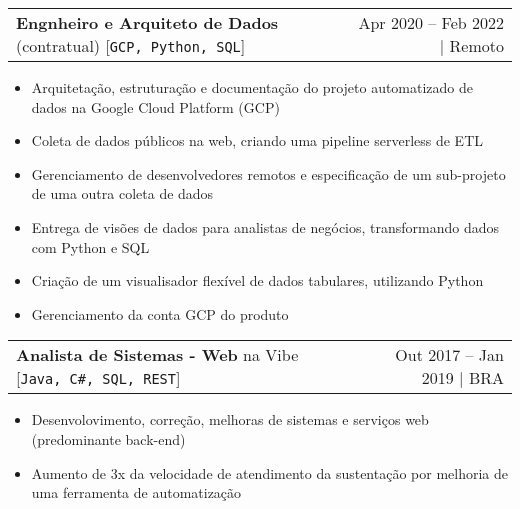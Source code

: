 \documentclass[a4paper,11pt]{article}
\makeatletter
\newcommand{\udensdot}[1]{%
    \tikz[baseline=(todotted.base)]{
        \node[inner sep=0.5pt,outer sep=0.5pt] (todotted) {#1};
        \draw[densely dotted] (todotted.south west) -- (todotted.south east);
    }%
}%
\newcommand{\myHref}[2]{\udensdot{\hspace{-1.2pt}\href{#1}{#2}\hspace{-4pt}}\hspace{-1.2pt}}
\newcommand{\myHrefIcn}[2]{#2 \href{#1}{\scriptsize{\faExternalLink{}}}}
\newcommand{\resumeItemCustom}[1]{
  \item\small{#1 \vspace{-2pt}}
}
\newcommand{\resumeJobSubheadingD}[7]{
  \vspace{0pt}\item
    \begin{tabular*}{0.97\textwidth}{l@{\extracolsep{\fill}}r}
      \textbf{#4} na \myHrefIcn{#1}{#2} \hspace{3pt} [\small \texttt{#6}] & {\small #5}
    \end{tabular*}\vspace{-6pt}
}
\newcommand{\resumeJobSubheadingDx}[5]{
  \vspace{0pt}\item
    \begin{tabular*}{0.97\textwidth}{l@{\extracolsep{\fill}}r}
      \textbf{#2} #1 \hspace{3pt} [\small \texttt{#4}] & {\small #3}
    \end{tabular*}\vspace{-6pt}
}
\newcommand{\resumeItemListStart}{\begin{itemize}}
\newcommand{\resumeItemListEnd}{\end{itemize}\vspace{-5pt}}
\newcommand{\csharp}{C\#}
\makeatother
\begin{document}
    \resumeJobSubheadingDx
      {(contratual)}%
      {Engnheiro e Arquiteto de Dados}{Apr 2020 -- Feb 2022 $\vert$ Remoto}
      {GCP, Python, SQL}%
      {Data platform creation, automated data integration}
      \resumeItemListStart
        \resumeItemCustom{Arquitetação, estruturação e documentação do projeto automatizado de dados na Google Cloud Platform (GCP)}
        \resumeItemCustom{Coleta de dados públicos na web, criando uma pipeline serverless de ETL}
        \resumeItemCustom{Gerenciamento de desenvolvedores remotos e especificação de um sub-projeto de uma outra coleta de dados}
        \resumeItemCustom{Entrega de visões de dados para analistas de negócios, transformando dados com Python e SQL}
        \resumeItemCustom{Criação de um visualisador flexível de dados tabulares, utilizando Python}
        \resumeItemCustom{Gerenciamento da conta GCP do produto}
      \resumeItemListEnd
    
    \resumeJobSubheadingD
      {http://www.vibetecnologia.com/}{Vibe}{Tecnologia para negócios}%
      {Analista de Sistemas - Web}{Out 2017 -- Jan 2019 $\vert$ BRA}
      {Java, \csharp, SQL, REST}%
      {Aplicativos web de Internet Banking, sistemas de gerenciamento, serviços web para o banco \myHref{http://www.banpara.b.br/}{Banpará}}
      \resumeItemListStart
        \resumeItemCustom{Desenvolovimento, correção, melhoras de sistemas e serviços web (predominante back-end)}
        \resumeItemCustom{Aumento de 3x da velocidade de atendimento da sustentação por melhoria de uma ferramenta de automatização}
      \resumeItemListEnd
\end{document}
